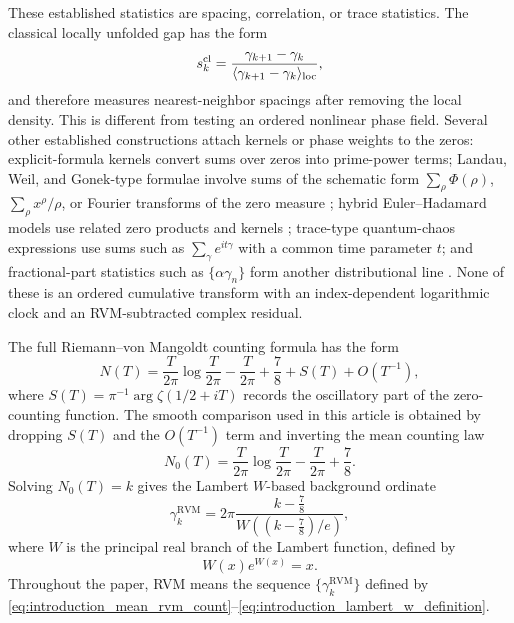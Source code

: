\documentclass[12pt]{article}
\numberwithin{equation}{section}
\newcommand{\RVM}{\mathrm{RVM}}
\begin{document}
These established statistics are spacing, correlation, or trace statistics.  The classical locally unfolded gap has the form
\begin{equation}
s_k^{\rm cl}
=
\frac{\gamma_{k+1}-\gamma_k}{\langle \gamma_{k+1}-\gamma_k\rangle_{\rm loc}},
\label{eq:introduction_classical_unfolded_gap}
\end{equation}
and therefore measures nearest-neighbor spacings after removing the local density.  This is different from testing an ordered nonlinear phase field.  Several other established constructions attach kernels or phase weights to the zeros: explicit-formula kernels convert sums over zeros into prime-power terms; Landau, Weil, and Gonek-type formulae involve sums of the schematic form \(\sum_\rho \Phi(\rho)\), \(\sum_\rho x^\rho/\rho\), or Fourier transforms of the zero measure \cite{Titchmarsh1986,Edwards1974,IwaniecKowalski2004,Landau1911,Weil1952,Gonek1993}; hybrid Euler--Hadamard models use related zero products and kernels \cite{GonekHughesKeating2007}; trace-type quantum-chaos expressions use sums such as \(\sum_\gamma e^{it\gamma}\) with a common time parameter \(t\); and fractional-part statistics such as \(\{\alpha\gamma_n\}\) form another distributional line \cite{FordZaharescu2009}.  None of these is an ordered cumulative transform with an index-dependent logarithmic clock and an RVM-subtracted complex residual.

The full Riemann--von Mangoldt counting formula has the form
\begin{equation}
N(T)
=
\frac{T}{2\pi}\log\frac{T}{2\pi}
-
\frac{T}{2\pi}
+
\frac{7}{8}
+
S(T)
+
O(T^{-1}),
\label{eq:introduction_full_rvm_count}
\end{equation}
where \(S(T)=\pi^{-1}\arg\zeta(1/2+iT)\) records the oscillatory part of the zero-counting function.  The smooth comparison used in this article is obtained by dropping \(S(T)\) and the \(O(T^{-1})\) term and inverting the mean counting law
\begin{equation}
N_0(T)
=
\frac{T}{2\pi}\log\frac{T}{2\pi}
-
\frac{T}{2\pi}
+
\frac{7}{8}.
\label{eq:introduction_mean_rvm_count}
\end{equation}
Solving \(N_0(T)=k\) gives the Lambert \(W\)-based background ordinate
\begin{equation}
\gamma_k^{\RVM}
=
2\pi
\frac{k-\frac{7}{8}}
{W\!\left((k-\frac{7}{8})/e\right)},
\label{eq:introduction_lambert_rvm_inverse}
\end{equation}
where \(W\) is the principal real branch of the Lambert function, defined by
\begin{equation}
W(x)e^{W(x)}=x.
\label{eq:introduction_lambert_w_definition}
\end{equation}
Throughout the paper, RVM means the sequence \(\{\gamma_k^{\RVM}\}\) defined by \eqref{eq:introduction_mean_rvm_count}--\eqref{eq:introduction_lambert_w_definition}.
\end{document}
